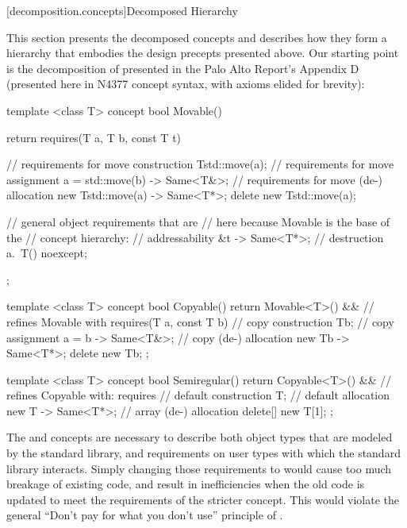[decomposition.concepts]{Decomposed Hierarchy}

\pnum
This section presents the decomposed concepts and describes how they form a hierarchy that
embodies the design precepts presented above. Our starting point is the decomposition of
 presented in the Palo Alto Report's Appendix D (presented here in N4377
concept syntax, with axioms elided for brevity):

\begin{codeblock}
template <class T>
concept bool Movable() {
  return requires(T a, T b, const T t) {
    // requirements for move construction
    T{std::move(a)};
    // requirements for move assignment
    { a = std::move(b) } -> Same<T&>;
    // requirements for move (de-) allocation
    { new T{std::move(a)} } -> Same<T*>;
    delete new T{std::move(a)};

    // general object requirements that are
    // here because Movable is the base of the
    // concept hierarchy:
    // addressability
    { &t } -> Same<T*>;
    // destruction
    { a.~T() } noexcept;
  };
}

template <class T>
concept bool Copyable() {
  return Movable<T>() && // refines Movable with
    requires(T a, const T b) {
      // copy construction
      T{b};
      // copy assignment
      { a = b } -> Same<T&>;
      // copy (de-) allocation
      { new T{b} } -> Same<T*>;
      delete new T{b};
    };
}

template <class T>
concept bool Semiregular() {
  return Copyable<T>() && // refines Copyable with:
    requires {
      // default construction
      T{};
      // default allocation
      { new T{} } -> Same<T*>;
      // array (de-) allocation
      delete[] new T[1];
    };
}
\end{codeblock}
The  and  concepts are necessary to describe both object types
that are modeled by the standard library, and requirements on user types with which the standard
library interacts. Simply changing those requirements to  would cause too
much breakage of existing code, and result in inefficiencies when the old code is updated to meet
the requirements of the stricter concept. This would violate the general ``Don't pay for what you
don't use'' principle of \Cpp.

